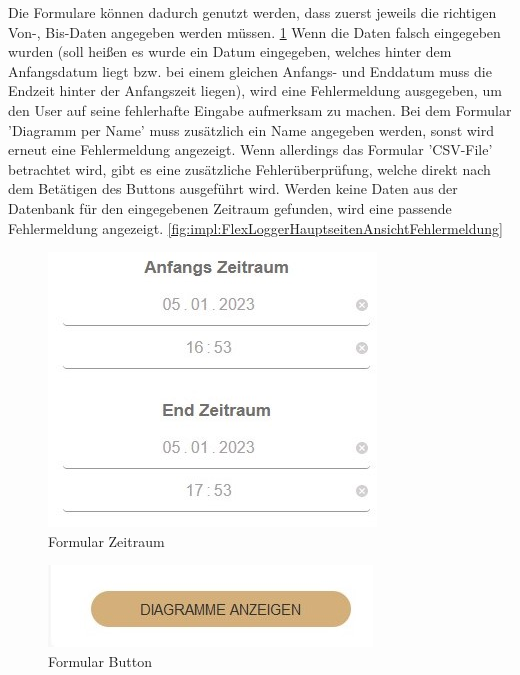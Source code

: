 Die Formulare können dadurch genutzt werden, dass zuerst jeweils die richtigen Von-, Bis-Daten angegeben werden müssen. \ref{fig:impl:FlexLoggerHauptseitenAnsichtZeitraum} Wenn die Daten falsch eingegeben wurden (soll heißen es wurde ein Datum eingegeben, welches hinter dem Anfangsdatum liegt bzw. bei einem gleichen Anfangs- und Enddatum muss die Endzeit hinter der Anfangszeit liegen), wird eine Fehlermeldung ausgegeben, um den User auf seine fehlerhafte Eingabe aufmerksam zu machen. Bei dem Formular 'Diagramm per Name' muss zusätzlich ein Name angegeben werden, sonst wird erneut eine Fehlermeldung angezeigt. Wenn allerdings das Formular 'CSV-File' betrachtet wird, gibt es eine zusätzliche Fehlerüberprüfung, welche direkt nach dem Betätigen des Buttons ausgeführt wird. Werden keine Daten aus der Datenbank für den eingegebenen Zeitraum gefunden, wird eine passende Fehlermeldung angezeigt. \ref{fig:impl:FlexLoggerHauptseitenAnsichtFehlermeldung}
 
\begin{figure}
    \centering
    \includegraphics[scale=1]{pics/FlexLoggerWebsiteFormulare_zeitraum.jpg}
    \caption{Formular Zeitraum}
    \label{fig:impl:FlexLoggerHauptseitenAnsichtZeitraum}
\end{figure}
 
\begin{figure}
    \centering
    \includegraphics[scale=1]{pics/FlexLoggerWebsiteFormulare_button.jpg}
    \caption{Formular Button}
    \label{fig:impl:FlexLoggerHauptseitenAnsichtButton}
\end{figure}
 
